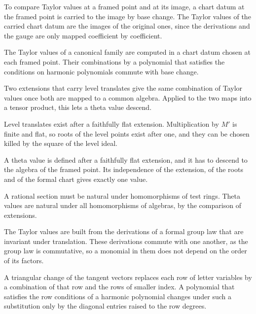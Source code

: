 To compare Taylor values at a framed point and at its image, a chart datum at the framed point is carried to the
image by base change. The Taylor values of the carried chart datum are the images of the original ones, since the
derivations and the gauge are only mapped coefficient by coefficient.

The Taylor values of a canonical family are computed in a chart datum chosen at each framed point. Their
combinations by a polynomial that satisfies the conditions on harmonic polynomials commute with base change.

Two extensions that carry level translates give the same combination of Taylor values once both are mapped to a
common algebra. Applied to the two maps into a tensor product, this lets a theta value descend.

Level translates exist after a faithfully flat extension. Multiplication by $M'$ is finite and flat, so roots of the
level points exist after one, and they can be chosen killed by the square of the level ideal.

A theta value is defined after a faithfully flat extension, and it has to descend to the algebra of the framed point.
Its independence of the extension, of the roots and of the formal chart gives exactly one value.

A rational section must be natural under homomorphisms of test rings. Theta values are natural under all
homomorphisms of algebras, by the comparison of extensions.

The Taylor values are built from the derivations of a formal group law that are invariant under translation. These
derivations commute with one another, as the group law is commutative, so a monomial in them does not depend on the
order of its factors.

A triangular change of the tangent vectors replaces each row of letter variables by a combination of that row and the
rows of smaller index. A polynomial that satisfies the row conditions of a harmonic polynomial changes under such a
substitution only by the diagonal entries raised to the row degrees.

